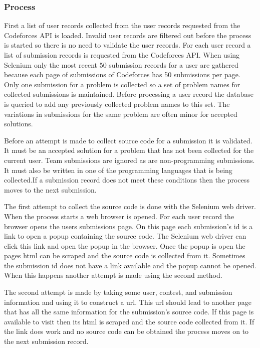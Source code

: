 \documentclass[12pt]{article}
\begin{document}
\subsubsection*{Process}
First a list of user records collected from the user records requested from the Codeforces API is loaded. Invalid user records are filtered out before the process is started so there is no need to validate the user records. For each user record a list of submission records is requested from the Codeforces API. When using Selenium only the most recent 50 submission records for a user are gathered because each page of submissions of Codeforces has 50 submissions per page. Only one submission for a problem is collected so a set of problem names for collected submissions is maintained. Before processing a user record the database is queried to add any previously collected problem names to this set.  The variations in submissions for the same problem are often minor for accepted solutions.

Before an attempt is made to collect source code for a submission it is validated. It must be an accepted solution for a problem that has not been collected for the current user. Team submissions are ignored as are non-programming submissions. It must also be written in one of the programming languages that is being collected.If a submission record does not meet these conditions then the process moves to the next submission.

The first attempt to collect the source code is done with the Selenium web driver. When the process starts a web browser is opened. For each user record the browser opens the users submissions page. On this page each submission's id is a link to open a popup containing the source code. The Selenium web driver can click this link and open the popup in the browser. Once the popup is open the pages html can be scraped and the source code is collected from it. Sometimes the submission id does not have a link available and the popup cannot be opened. When this happens another attempt is made using the second method.

The second attempt is made by taking some user, contest, and submission information and using it to construct a url. This url should lead to another page that has all the same information for the submission's source code. If this page is available to visit then its html is scraped and the source code collected from it. If the link does work and no source code can be obtained the process moves on to the next submission record.
\end{document}
